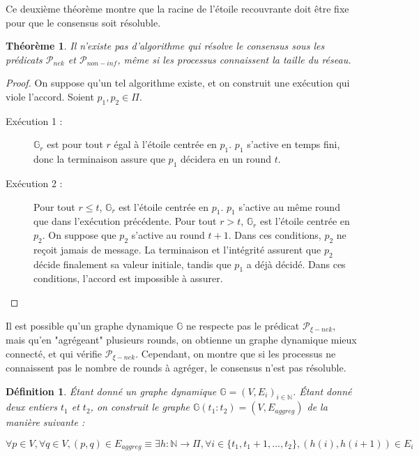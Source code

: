 \documentclass{article}
\newtheorem{theorem}{Théorème}
\newtheorem{definition}{Définition}
\begin{document}
Ce deuxième théorème montre que la racine de l'étoile recouvrante doit être fixe pour que le consensus soit résoluble.

\begin{theorem}
	Il n'existe pas d'algorithme qui résolve le consensus sous les prédicats $\mathcal{P}_{nek}$ et $\mathcal{P}_{non-inf}$, même si les processus connaissent la taille du réseau.
\end{theorem}
\begin{proof}
	On suppose qu'un tel algorithme existe, et on construit une exécution qui viole l'accord.
	Soient $p_1, p_2 \in \Pi$.
	\begin{description}

		\item[Exécution 1 :] $\mathds{G}_r$ est pour tout $r$ égal à l'étoile centrée en $p_1$. $p_1$ s'active en temps fini, donc la terminaison assure que $p_1$ décidera en un round $t$.
		\item[Exécution 2 :] Pour tout $r \leq t$, $\mathds{G}_r$ est l'étoile centrée en $p_1$. $p_1$ s'active au même round que dans l'exécution précédente.
			Pour tout $r > t$, $\mathds{G}_r$ est l'étoile centrée en $p_2$. On suppose que $p_2$ s'active au round $t+1$.
			Dans ces conditions, $p_2$ ne reçoit jamais de message. La terminaison et l'intégrité assurent que $p_2$ décide finalement sa valeur initiale,
			tandis que $p_1$ a déjà décidé. Dans ces conditions, l'accord est impossible à assurer.

	\end{description}
\end{proof}

Il est possible qu'un graphe dynamique $\mathds{G}$ ne respecte pas le prédicat $\mathcal{P}_{\xi-nek}$, mais qu'en "agrégeant" plusieurs rounds, on obtienne un graphe dynamique mieux connecté,
et qui vérifie $\mathcal{P}_{\xi-nek}$.
Cependant, on montre que si les processus ne connaissent pas le nombre de rounds à agréger, le consensus n'est pas résoluble.

\begin{definition}
	Étant donné un graphe dynamique $\mathds{G} = (V, E_i)_{i \in \mathds{N}}$.
	Étant donné deux entiers $t_1$ et $t_2$, on construit le graphe $\mathds{G}(t_1 : t_2) = (V, E_{aggreg})$ de la manière suivante :

	$$\forall p \in V, \forall q \in V, (p, q) \in E_{aggreg} \equiv \exists h : \mathds{N} \rightarrow \Pi, \forall i \in \{t_1, t_1 + 1, ..., t_2\}, (h(i), h(i+1)) \in E_i$$
\end{definition}
\end{document}
